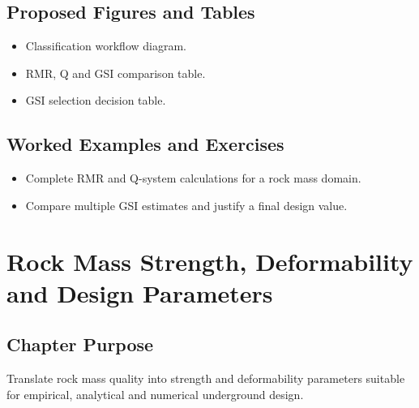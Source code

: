 \documentclass[12pt,oneside]{book}
\begin{document}
\section{Proposed Figures and Tables}
\begin{itemize}
    \item Classification workflow diagram.
    \item RMR, Q and GSI comparison table.
    \item GSI selection decision table.
\end{itemize}

\section{Worked Examples and Exercises}
\begin{itemize}
    \item Complete RMR and Q-system calculations for a rock mass domain.
    \item Compare multiple GSI estimates and justify a final design value.
\end{itemize}

\chapter{Rock Mass Strength, Deformability and Design Parameters}

\section{Chapter Purpose}
Translate rock mass quality into strength and deformability parameters suitable for empirical, analytical and numerical underground design.
\end{document}
